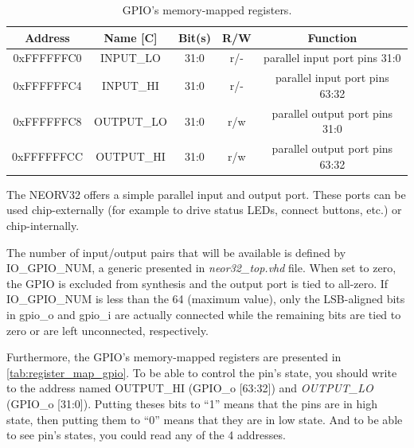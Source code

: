        \begin{table}[h]

        \centering
            \caption{\label{tab:register_map_gpio} GPIO's memory-mapped registers.}
            \begin{tabular}{ccccc}
                \toprule
                \textbf{Address} & \textbf{Name [C]} & \textbf{Bit(s)} & \textbf{R/W} & \textbf{Function} \\
                \midrule
                \midrule
                0xFFFFFFC0 & INPUT\_LO & 31:0 & r/- & parallel input port pins 31:0 \\ 
                0xFFFFFFC4 & INPUT\_HI & 31:0 & r/- & parallel input port pins 63:32 \\ 
                0xFFFFFFC8 & OUTPUT\_LO & 31:0 & r/w & parallel output port pins 31:0 \\ 
                0xFFFFFFCC & OUTPUT\_HI & 31:0 & r/w & parallel output port pins 63:32 \\ 
                \bottomrule
            \end{tabular}
        \end{table}

        The NEORV32 offers a simple parallel input and output port. These ports can be used chip-externally (for example to drive status LEDs, connect buttons, etc.) or chip-internally.

        \begin{tcolorbox}[colback=blue!5!white,colframe=blue!75!black,title=Extra information]
            The number of input/output pairs that will be available is defined by IO\_GPIO\_NUM, a generic presented in \textit{neor32\_top.vhd} file. When set to zero, the GPIO is excluded from synthesis and the output port is tied to all-zero. If IO\_GPIO\_NUM is less than the 64 (maximum value), only the LSB-aligned bits in gpio\_o and gpio\_i are actually connected while the remaining bits are tied to zero or are left unconnected, respectively.
        \end{tcolorbox}
        
        Furthermore, the GPIO's memory-mapped registers are presented in \autoref{tab:register_map_gpio}. To be able to control the pin's state, you should write to the address named OUTPUT\_HI (GPIO\_o [63:32]) and \textit{OUTPUT\_LO} (GPIO\_o [31:0]). Putting theses bits to ``1'' means that the pins are in high state, then putting them to ``0'' means that they are in low state. And to be able to see pin's states, you could read any of the 4 addresses. 

